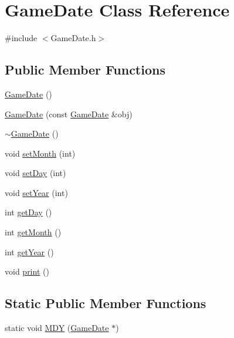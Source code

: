 \hypertarget{class_game_date}{}\section{Game\+Date Class Reference}
\label{class_game_date}


{\ttfamily \#include $<$Game\+Date.\+h$>$}

\subsection*{Public Member Functions}
\begin{DoxyCompactItemize}
\item 
\hyperlink{class_game_date_ab0e226510ab6260cd438add7ad3b0e6f}{Game\+Date} ()
\item 
\hyperlink{class_game_date_ac1ae5749ab973a55a85a1fd69e04e003}{Game\+Date} (const \hyperlink{class_game_date}{Game\+Date} \&obj)
\item 
\hyperlink{class_game_date_a036e058a9f70791d229de1568e1a2c73}{$\sim$\+Game\+Date} ()
\item 
void \hyperlink{class_game_date_a55608e9a69e32403ae008291681bbf59}{set\+Month} (int)
\item 
void \hyperlink{class_game_date_aba5c6ab5a4f050ceb431fbcd037009d3}{set\+Day} (int)
\item 
void \hyperlink{class_game_date_adcaba92c4db1fa259a5d8ae9704064e5}{set\+Year} (int)
\item 
int \hyperlink{class_game_date_aa5f51d52c16e608253fd4c2762a1dfbb}{get\+Day} ()
\item 
int \hyperlink{class_game_date_a2b8fba33da7e4820587a2e6ccc9411e0}{get\+Month} ()
\item 
int \hyperlink{class_game_date_ac996cd8d1fbd5a4ad9ede22a6b9aa7aa}{get\+Year} ()
\item 
void \hyperlink{class_game_date_ae0829c804c22c72d1fe34080aed5cea3}{print} ()
\end{DoxyCompactItemize}
\subsection*{Static Public Member Functions}
\begin{DoxyCompactItemize}
\item 
static void \hyperlink{class_game_date_a46f2fcc90a57600fd45b783d9f8cd0c3}{M\+D\+Y} (\hyperlink{class_game_date}{Game\+Date} $\ast$)
\end{DoxyCompactItemize}



